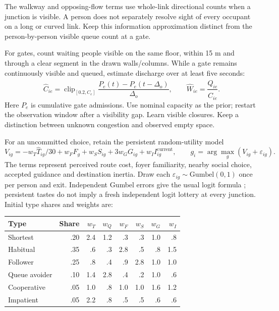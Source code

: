 \documentclass[11pt,a4paper]{article}
\newcommand{\clip}{\operatorname{clip}}
\begin{document}
The walkway and opposing-flow terms use whole-link directional counts when a junction is visible. A person does not separately resolve sight of every occupant on a long or curved link. Keep this information approximation distinct from the person-by-person visible queue count at a gate.

For gates, count waiting people visible on the same floor, within 15 m and through a clear segment in the drawn walls/columns. While a gate remains continuously visible and queued, estimate discharge over at least five seconds:
\begin{equation}\label{impl:eq15}
 \widehat C_{ie}=\clip_{[0.2,C_e]}\frac{P_e(t)-P_e(t-\Delta_o)}{\Delta_o},
 \qquad\widehat W_{ie}=\frac{\widehat Q_{ie}}{\widehat C_{ie}}.
\end{equation}
Here $P_e$ is cumulative gate admissions. Use nominal capacity as the prior; restart the observation window after a visibility gap. Learn visible closures. Keep a distinction between unknown congestion and observed empty space.

For an uncommitted choice, retain the persistent random-utility model
\begin{equation}\label{impl:eq16}
 V_{ig}=-w_T\widehat T_{ig}/30+w_FF_g+w_SS_{ig}+3w_GG_{ig}
 +w_II_{ig}^{\mathrm{current}},\qquad
 g_i=\arg\max_g(V_{ig}+\varepsilon_{ig}).
\end{equation}
The terms represent perceived route cost, foyer familiarity, nearby social choice, accepted guidance and destination inertia. Draw each $\varepsilon_{ig}\sim\mathrm{Gumbel}(0,1)$ once per person and exit. Independent Gumbel errors give the usual logit formula \cite{train}; persistent tastes do not imply a fresh independent logit lottery at every junction. Initial type shares and weights are:

\begin{center}\small
\begin{tabular}{lrrrrrrr}\toprule
Type & Share & $w_T$ & $w_Q$ & $w_F$ & $w_S$ & $w_G$ & $w_I$\\\midrule
Shortest & .20 & 2.4 & 1.2 & .3 & .3 & 1.0 & .8\\
Habitual & .35 & .6 & .3 & 2.8 & .5 & .8 & 1.5\\
Follower & .25 & .8 & .4 & .9 & 2.8 & 1.0 & 1.0\\
Queue avoider & .10 & 1.4 & 2.8 & .4 & .2 & 1.0 & .6\\
Cooperative & .05 & 1.0 & .8 & 1.0 & 1.0 & 1.6 & 1.2\\
Impatient & .05 & 2.2 & .8 & .5 & .5 & .6 & .6\\\bottomrule
\end{tabular}
\end{center}
\end{document}
